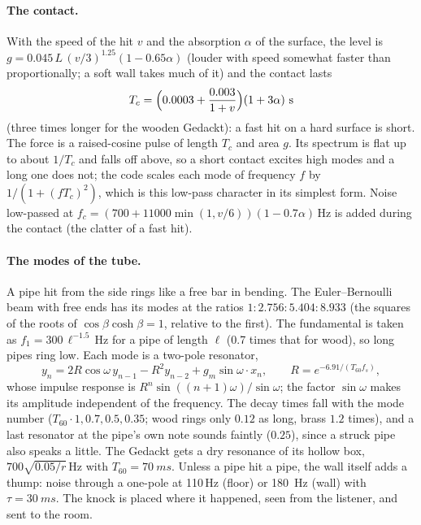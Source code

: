 \paragraph{The contact.} With the speed of the hit $v$ and the absorption $\alpha$ of the surface, the level is
$g = 0.045\,L\,(v/3)^{1.25}(1-0.65\alpha)$ (louder with speed somewhat faster than proportionally; a soft wall takes much
of it) and the contact lasts
\begin{equation}
  T_c = \Bigl(0.0003 + \frac{0.003}{1+v}\Bigr)(1+3\alpha)\ \mathrm{s}
\end{equation}
(three times longer for the wooden Gedackt): a fast hit on a hard surface is short. The force is a raised-cosine pulse
of length $T_c$ and area $g$. Its spectrum is flat up to about $1/T_c$ and falls off above, so a short contact excites high
modes and a long one does not; the code scales each mode of frequency $f$ by $1/(1+(fT_c)^2)$, which is this low-pass
character in its simplest form. Noise low-passed at $f_c = (700 + 11000\min(1,v/6))(1-0.7\alpha)$\,Hz is added during the
contact (the clatter of a fast hit).

\paragraph{The modes of the tube.} A pipe hit from the side rings like a free bar in bending. The Euler--Bernoulli beam
with free ends has its modes at the ratios $1 : 2.756 : 5.404 : 8.933$ (the squares of the roots of
$\cos\beta\cosh\beta = 1$, relative to the first). The fundamental is taken as $f_1 = 300\,\ell^{-1.5}$\,Hz for a
pipe of length $\ell$ (0.7 times that for wood), so long pipes ring low. Each mode is a two-pole resonator,
\begin{equation}
  y_n = 2R\cos\omega\,y_{n-1} - R^2y_{n-2} + g_m\sin\omega\cdot x_n,\qquad R = e^{-6.91/(T_{60}f_s)},
\end{equation}
whose impulse response is $R^n\sin((n+1)\omega)/\sin\omega$; the factor $\sin\omega$ makes its amplitude independent of the
frequency. The decay times fall with the mode number ($T_{60}\cdot 1, 0.7, 0.5, 0.35$; wood rings only $0.12$ as long, brass
$1.2$ times), and a last resonator at the pipe's own note sounds faintly ($0.25$), since a struck pipe also speaks a
little. The Gedackt gets a dry resonance of its hollow box, $700\sqrt{0.05/r}$\,Hz with $T_{60} = \SI{70}{ms}$. Unless a
pipe hit a pipe, the wall itself adds a thump: noise through a one-pole at 110\,Hz (floor) or \SI{180}{Hz} (wall) with
$\tau = \SI{30}{ms}$. The knock is placed where it happened, seen from the listener, and sent to the room.

